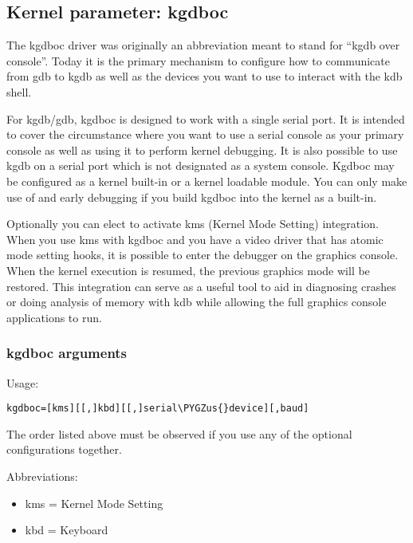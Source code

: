 \documentclass[a4paper,8pt,english]{sphinxmanual}
\def\PYGZus{\char`\_}
\begin{document}
\subsection{Kernel parameter: kgdboc}
\label{dev-tools/kgdb:kernel-parameter-kgdboc}
The kgdboc driver was originally an abbreviation meant to stand for
``kgdb over console''. Today it is the primary mechanism to configure how
to communicate from gdb to kgdb as well as the devices you want to use
to interact with the kdb shell.

For kgdb/gdb, kgdboc is designed to work with a single serial port. It
is intended to cover the circumstance where you want to use a serial
console as your primary console as well as using it to perform kernel
debugging. It is also possible to use kgdb on a serial port which is not
designated as a system console. Kgdboc may be configured as a kernel
built-in or a kernel loadable module. You can only make use of
 and early debugging if you build kgdboc into the kernel as
a built-in.

Optionally you can elect to activate kms (Kernel Mode Setting)
integration. When you use kms with kgdboc and you have a video driver
that has atomic mode setting hooks, it is possible to enter the debugger
on the graphics console. When the kernel execution is resumed, the
previous graphics mode will be restored. This integration can serve as a
useful tool to aid in diagnosing crashes or doing analysis of memory
with kdb while allowing the full graphics console applications to run.


\subsubsection{kgdboc arguments}
\label{dev-tools/kgdb:kgdboc-arguments}
Usage:

\begin{Verbatim}[commandchars=\\\{\}]
kgdboc=[kms][[,]kbd][[,]serial\PYGZus{}device][,baud]
\end{Verbatim}

The order listed above must be observed if you use any of the optional
configurations together.

Abbreviations:
\begin{itemize}
\item {} 
kms = Kernel Mode Setting

\item {} 
kbd = Keyboard

\end{itemize}
\end{document}
